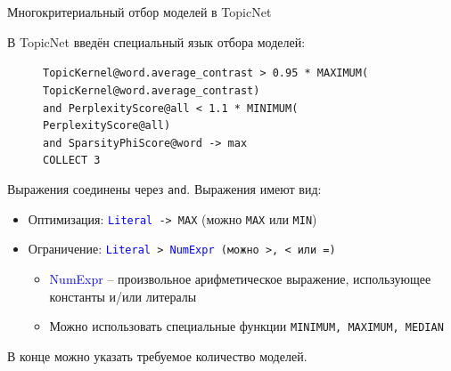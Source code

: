 \begin{frame}[t]{Многокритериальный отбор моделей в TopicNet}

В TopicNet введён специальный язык отбора моделей:

\begin{figure}[ht]
\raggedright
\texttt{TopicKernel@word.average\_contrast > 0.95 * MAXIMUM( \\
\hphantom{\ \ \ \ \ \ \ \ }TopicKernel@word.average\_contrast) \\
\hphantom{\ \ } and PerplexityScore@all < 1.1 * MINIMUM( \\
\hphantom{\ \ \ \ \ \ \ \ }PerplexityScore@all) \\
\hphantom{\ \ } and SparsityPhiScore@word -> max\\
\hphantom{\ \ } COLLECT 3} \\
\label{DSL-example}
\end{figure} 

Выражения соединены через \texttt{\colorbox{gray!30}{and}}. Выражения имеют вид:
{\small
    \begin{itemize}
        \setlength\itemsep{0em}
        \item Оптимизация: \texttt{\textcolor{blue}{Literal} -> MAX} (можно  \colorbox{gray!30}{\texttt{MAX}} или \colorbox{gray!30}{\texttt{MIN}})
        \item Ограничение: \texttt{\textcolor{blue}{Literal} > \textcolor{blue}{NumExpr} (можно \colorbox{gray!30}{>}, \colorbox{gray!30}{<} или \colorbox{gray!30}{=})}
            \begin{itemize}
            \item{\textcolor{blue}{NumExpr}} -- произвольное арифметическое выражение, использующее константы и/или литералы
            \item{Можно использовать специальные функции \texttt{MINIMUM, MAXIMUM, MEDIAN}}
            \end{itemize}
    \end{itemize}}
В конце можно указать требуемое количество моделей.
\end{frame}

